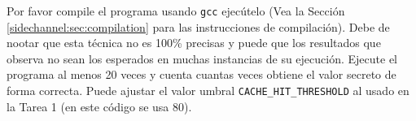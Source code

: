Por favor compile el programa usando \texttt{gcc} ejecútelo (Vea la Sección \ref{sidechannel:sec:compilation} para las instrucciones de compilación).
Debe de nootar que esta técnica no es 100\% precisas y puede que los resultados que observa no sean los esperados en muchas instancias de su ejecución.
Ejecute el programa al menos 20 veces y cuenta cuantas veces obtiene el valor secreto de forma correcta. Puede ajustar el valor umbral \texttt{CACHE\_HIT\_THRESHOLD} al usado en la Tarea 1 (en este código se usa 80).

